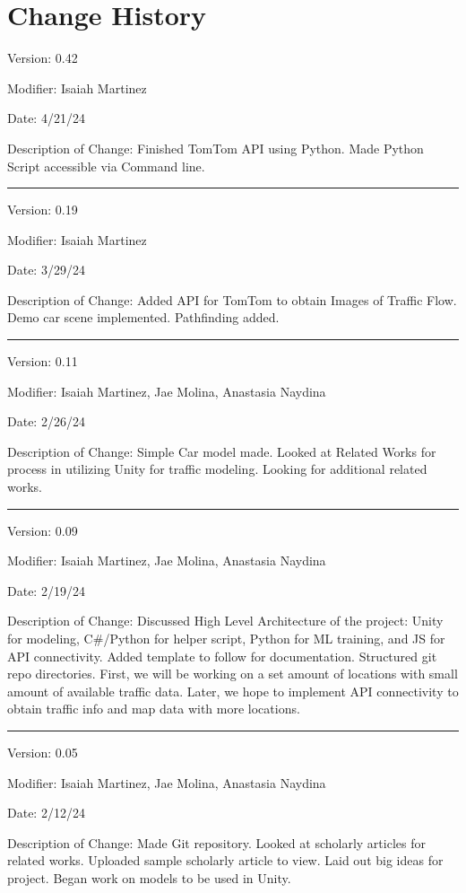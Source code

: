 \section{Change History}

Version: 0.42

Modifier: Isaiah Martinez

Date: 4/21/24

Description of Change: Finished TomTom API using Python.
Made Python Script accessible via Command line.

\noindent\rule{12cm}{0.4pt}

Version: 0.19

Modifier: Isaiah Martinez

Date: 3/29/24

Description of Change: Added API for TomTom to obtain Images of Traffic Flow.
Demo car scene implemented.
Pathfinding added.

\noindent\rule{12cm}{0.4pt}

Version: 0.11

Modifier: Isaiah Martinez, Jae Molina, Anastasia Naydina

Date: 2/26/24

Description of Change: Simple Car model made. 
Looked at Related Works for process in utilizing Unity for traffic modeling.
Looking for additional related works.

\noindent\rule{12cm}{0.4pt}

Version: 0.09

Modifier: Isaiah Martinez, Jae Molina, Anastasia Naydina

Date: 2/19/24

Description of Change: Discussed High Level Architecture of the project: Unity for modeling, C\#/Python for helper script, Python for ML training, and JS for API connectivity.
Added template to follow for documentation.
Structured git repo directories.
First, we will be working on a set amount of locations with small amount of available traffic data.
Later, we hope to implement API connectivity to obtain traffic info and map data with more locations.

\noindent\rule{12cm}{0.4pt}

Version: 0.05

Modifier: Isaiah Martinez, Jae Molina, Anastasia Naydina

Date: 2/12/24

Description of Change: Made Git repository. 
Looked at scholarly articles for related works.
Uploaded sample scholarly article to view.
Laid out big ideas for project.
Began work on models to be used in Unity.